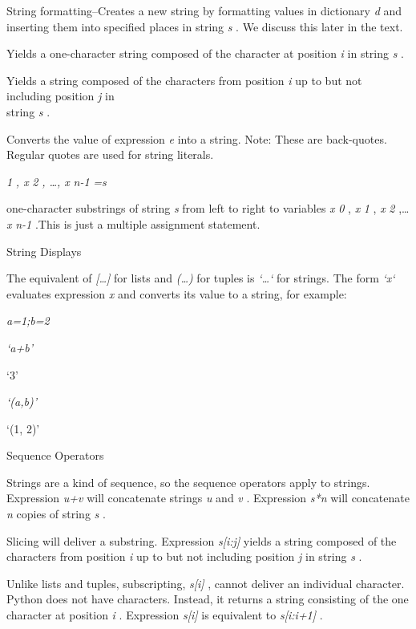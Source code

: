 String formatting--Creates a new
string by formatting values in dictionary \emph{d} and inserting them
into specified places in string \emph{s} . We discuss this later in the
text.



Yields a one-character string
composed of the character at position \emph{i} in string \emph{s} .



Yields a string composed of the
characters from position \emph{i} up to but not including position
\emph{j} in\\
string \emph{s} .



Converts the value of expression
\emph{e} into a string. Note: These are back-quotes. Regular quotes are
used for string literals.


\emph{1} \emph{, x} \emph{2} \emph{, \ldots{}, x} \emph{n-1} \emph{=s}

 one-character
substrings of string \emph{s} from left to right to variables \emph{x}
\emph{0} , \emph{x} \emph{1} , \emph{x} \emph{2} ,\ldots{} \emph{x}
\emph{n-1} .This is just a multiple assignment statement.

String Displays

The equivalent of
\emph{{[}\ldots{}{]}} for lists and \emph{(\ldots{})} for tuples is
\emph{`\ldots{}`} for strings. The form \emph{`x`} evaluates expression
\emph{x} and converts its value to a string, for example:


\emph{a=1;b=2}


\emph{`a+b'}

`3'


\emph{`(a,b)'}

`(1, 2)'

Sequence Operators

Strings are a kind of sequence, so
the sequence operators apply to strings. Expression \emph{u+v} will
concatenate strings \emph{u} and \emph{v} . Expression \emph{s*n} will
concatenate \emph{n} copies of string \emph{s} .

Slicing will deliver a substring.
Expression \emph{s{[}i:j{]}} yields a string composed of the characters
from position \emph{i} up to but not including position \emph{j} in
string \emph{s} .

Unlike lists and tuples,
subscripting, \emph{s{[}i{]}} , cannot deliver an individual character.
Python does not have characters. Instead, it returns a string consisting
of the one character at position \emph{i} . Expression \emph{s{[}i{]}}
is equivalent to \emph{s{[}i:i+1{]}} .

